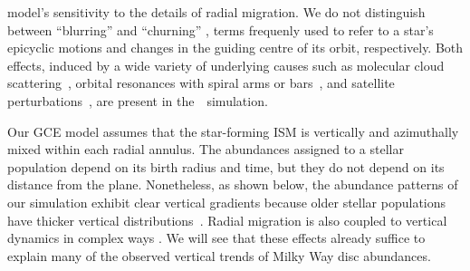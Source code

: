 model's sensitivity to the details of radial migration. 
We do not distinguish between ``blurring'' and ``churning'' 
\citep{Schoenrich2009a}, terms frequenly used to refer to a star's epicyclic 
motions and changes in the guiding centre of its orbit, respectively. 
Both effects, induced by a wide variety of underlying causes such as molecular 
cloud scattering~\citep{Mihalas1981, Jenkins1990, Jenkins1992}, orbital 
resonances with spiral arms or bars~\citep{Sellwood2002, Minchev2011}, and 
satellite perturbations~\citep{Bird2012}, are present in the~\hsim~simulation. 
\par 
Our GCE model assumes that the star-forming ISM is vertically and azimuthally 
mixed within each radial annulus. 
The abundances assigned to a stellar population depend on its birth radius and 
time, but they do not depend on its distance from the plane. 
Nonetheless, as shown below, the abundance patterns of our simulation exhibit 
clear vertical gradients because older stellar populations have thicker 
vertical distributions~\citep{Bird2021}. 
Radial migration is also coupled to vertical dynamics in complex ways 
\citep{Solway2012, Minchev2012}. 
We will see that these effects already suffice to explain many of the observed 
vertical trends of Milky Way disc abundances. 


